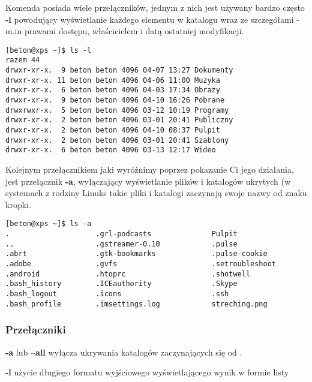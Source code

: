 \documentclass[10 pt, a4paper, draft]{report}
\begin{document}
Komenda posiada wiele przełączników, jednym z nich jest używany bardzo często \textbf{-l} powodujący wyświetlanie każdego elementu w katalogu wraz ze szczegółami - m.in prawami dostępu, właścicielem i datą ostatniej modyfikacji.
\begin{verbatim}
[beton@xps ~]$ ls -l
razem 44
drwxr-xr-x.  9 beton beton 4096 04-07 13:27 Dokumenty
drwxr-xr-x. 11 beton beton 4096 04-06 11:00 Muzyka
drwxr-xr-x.  6 beton beton 4096 04-03 17:34 Obrazy
drwxr-xr-x.  9 beton beton 4096 04-10 16:26 Pobrane
drwxrwxr-x.  5 beton beton 4096 03-12 10:19 Programy
drwxr-xr-x.  2 beton beton 4096 03-01 20:41 Publiczny
drwxr-xr-x.  2 beton beton 4096 04-10 08:37 Pulpit
drwxr-xr-x.  2 beton beton 4096 03-01 20:41 Szablony
drwxr-xr-x.  6 beton beton 4096 03-13 12:17 Wideo
\end{verbatim}
Kolejnym przełącznikiem jaki wyróżnimy poprzez pokazanie Ci jego działania, jest przełącznik \textbf{-a}, wyłączający wyświetlanie plików i katalogów ukrytych (w systemach z rodziny Linuks takie pliki i katalogi zaczynają swoje nazwy od znaku kropki.
\begin{verbatim}
[beton@xps ~]$ ls -a
.                    .grl-podcasts              Pulpit
..                   .gstreamer-0.10            .pulse
.abrt                .gtk-bookmarks             .pulse-cookie
.adobe               .gvfs                      .setroubleshoot
.android             .htoprc                    .shotwell
.bash_history        .ICEauthority              .Skype
.bash_logout         .icons                     .ssh
.bash_profile        .imsettings.log            streching.png
\end{verbatim}
\subsubsection*{Przełączniki}
\begin{description}
\item \textbf{-a} lub \textbf{--all} wyłącza ukrywania katalogów zaczynających się od .
\item \textbf{-l} użycie długiego formatu wyjściowego wyświetlającego wynik w formie listy
\end{description}
\end{document}

